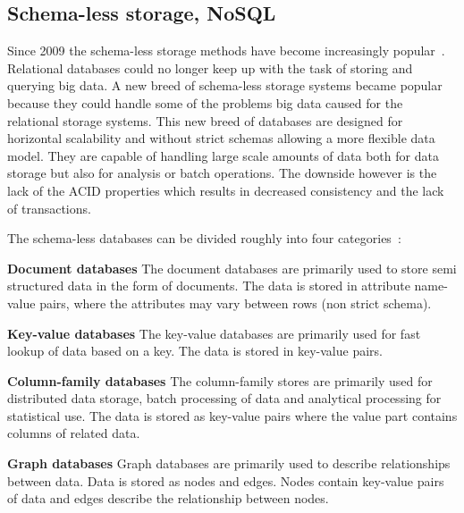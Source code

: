 \subsection{Schema-less storage, NoSQL}
\label{sec:nosql}
Since 2009 the schema-less storage methods have become increasingly popular~\cite{Stonebraker:2010:SDV:1721654.1721659}.
Relational databases could no longer keep up with the task of storing and querying big data.
A new breed of schema-less storage systems became popular because they could handle some of the problems big data caused for the relational storage systems.
This new breed of databases are designed for horizontal scalability and without strict schemas allowing a more flexible data model. 
They are capable of handling large scale amounts of data both for data storage but also for analysis or batch operations.
The downside however is the lack of the ACID properties which results in decreased consistency and the lack of transactions.

The schema-less databases can be divided roughly into four categories~\cite{Fowler:IntroNoSQL, Moniruzzaman:NoSQLDatabaseNewEraOfDatabasesForBigDataAnalysis}:

\begin{description}
	\item \textbf{Document databases} The document databases are primarily used to store semi structured data in the form of documents. The data is stored in attribute name-value pairs, where the attributes may vary between rows (non strict schema).
	
	\item \textbf{Key-value databases} The key-value databases are primarily used for fast lookup of data based on a key. The data is stored in key-value pairs.
	
	\item \textbf{Column-family databases} The column-family stores are primarily used for distributed data storage, batch processing of data and analytical processing for statistical use. The data is stored as key-value pairs where the value part contains columns of related data.
	
	\item \textbf{Graph databases} Graph databases are primarily used to describe relationships between data. Data is stored as nodes and edges. Nodes contain key-value pairs of data and edges describe the relationship between nodes.
\end{description}

